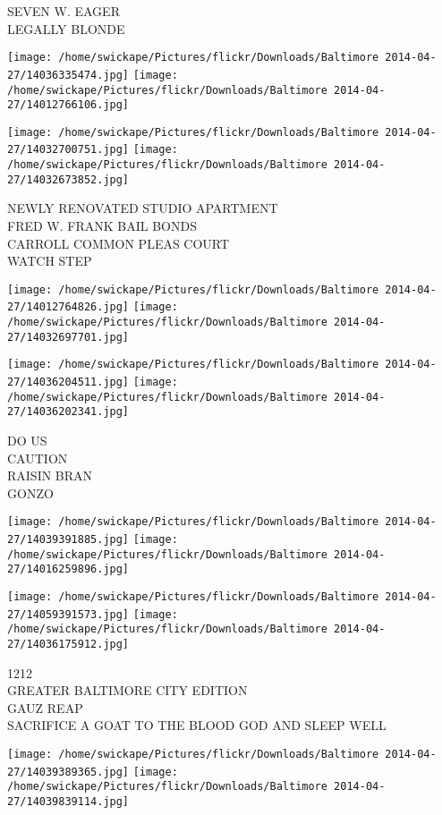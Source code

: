 \documentclass[10pt,letterpaper]{article}
\begin{document}
SEVEN W. EAGER\\
LEGALLY BLONDE
\pagebreak

\texttt{[image: /home/swickape/Pictures/flickr/Downloads/Baltimore 2014-04-27/14036335474.jpg]}
\texttt{[image: /home/swickape/Pictures/flickr/Downloads/Baltimore 2014-04-27/14012766106.jpg]}

\texttt{[image: /home/swickape/Pictures/flickr/Downloads/Baltimore 2014-04-27/14032700751.jpg]}
\texttt{[image: /home/swickape/Pictures/flickr/Downloads/Baltimore 2014-04-27/14032673852.jpg]}

NEWLY RENOVATED STUDIO APARTMENT\\
FRED W. FRANK BAIL BONDS\\
CARROLL COMMON PLEAS COURT\\
WATCH STEP
\pagebreak

\texttt{[image: /home/swickape/Pictures/flickr/Downloads/Baltimore 2014-04-27/14012764826.jpg]}
\texttt{[image: /home/swickape/Pictures/flickr/Downloads/Baltimore 2014-04-27/14032697701.jpg]}

\texttt{[image: /home/swickape/Pictures/flickr/Downloads/Baltimore 2014-04-27/14036204511.jpg]}
\texttt{[image: /home/swickape/Pictures/flickr/Downloads/Baltimore 2014-04-27/14036202341.jpg]}

DO US\\
CAUTION\\
RAISIN BRAN\\
GONZO
\pagebreak

\texttt{[image: /home/swickape/Pictures/flickr/Downloads/Baltimore 2014-04-27/14039391885.jpg]}
\texttt{[image: /home/swickape/Pictures/flickr/Downloads/Baltimore 2014-04-27/14016259896.jpg]}

\texttt{[image: /home/swickape/Pictures/flickr/Downloads/Baltimore 2014-04-27/14059391573.jpg]}
\texttt{[image: /home/swickape/Pictures/flickr/Downloads/Baltimore 2014-04-27/14036175912.jpg]}

1212\\
GREATER BALTIMORE CITY EDITION\\
GAUZ REAP\\
SACRIFICE A GOAT TO THE BLOOD GOD AND SLEEP WELL
\pagebreak

\texttt{[image: /home/swickape/Pictures/flickr/Downloads/Baltimore 2014-04-27/14039389365.jpg]}
\texttt{[image: /home/swickape/Pictures/flickr/Downloads/Baltimore 2014-04-27/14039839114.jpg]}
\end{document}
